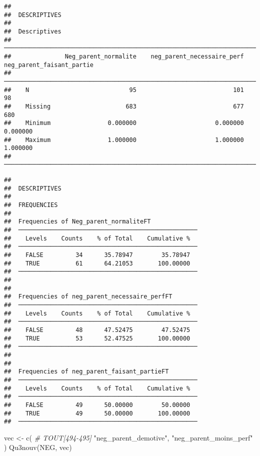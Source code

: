 \documentclass[
]{article}
\newenvironment{Shaded}{\begin{snugshade}}{\end{snugshade}}
\newcommand{\CommentTok}[1]{\textcolor[rgb]{0.56,0.35,0.01}{\textit{#1}}}
\newcommand{\FunctionTok}[1]{\textcolor[rgb]{0.00,0.00,0.00}{#1}}
\newcommand{\NormalTok}[1]{#1}
\newcommand{\OtherTok}[1]{\textcolor[rgb]{0.56,0.35,0.01}{#1}}
\newcommand{\StringTok}[1]{\textcolor[rgb]{0.31,0.60,0.02}{#1}}
\begin{document}
\begin{verbatim}
## 
##  DESCRIPTIVES
## 
##  Descriptives                                                                                   
##  ────────────────────────────────────────────────────────────────────────────────────────────── 
##               Neg_parent_normalite    neg_parent_necessaire_perf    neg_parent_faisant_partie   
##  ────────────────────────────────────────────────────────────────────────────────────────────── 
##    N                            95                           101                           98   
##    Missing                     683                           677                          680   
##    Minimum                0.000000                      0.000000                     0.000000   
##    Maximum                1.000000                      1.000000                     1.000000   
##  ──────────────────────────────────────────────────────────────────────────────────────────────
\end{verbatim}

\begin{verbatim}
## 
##  DESCRIPTIVES
## 
##  FREQUENCIES
## 
##  Frequencies of Neg_parent_normaliteFT              
##  ────────────────────────────────────────────────── 
##    Levels    Counts    % of Total    Cumulative %   
##  ────────────────────────────────────────────────── 
##    FALSE         34      35.78947        35.78947   
##    TRUE          61      64.21053       100.00000   
##  ────────────────────────────────────────────────── 
## 
## 
##  Frequencies of neg_parent_necessaire_perfFT        
##  ────────────────────────────────────────────────── 
##    Levels    Counts    % of Total    Cumulative %   
##  ────────────────────────────────────────────────── 
##    FALSE         48      47.52475        47.52475   
##    TRUE          53      52.47525       100.00000   
##  ────────────────────────────────────────────────── 
## 
## 
##  Frequencies of neg_parent_faisant_partieFT         
##  ────────────────────────────────────────────────── 
##    Levels    Counts    % of Total    Cumulative %   
##  ────────────────────────────────────────────────── 
##    FALSE         49      50.00000        50.00000   
##    TRUE          49      50.00000       100.00000   
##  ──────────────────────────────────────────────────
\end{verbatim}

\begin{Shaded}
\begin{Highlighting}[]
\NormalTok{vec }\OtherTok{\textless{}{-}} \FunctionTok{c}\NormalTok{(   }\CommentTok{\# TOUT[494{-}495]}
  \StringTok{"neg\_parent\_demotive"}\NormalTok{,}
  \StringTok{"neg\_parent\_moins\_perf"}\NormalTok{  )}
\FunctionTok{Qu3nouv}\NormalTok{(NEG, vec)}
\end{Highlighting}
\end{Shaded}
\end{document}
